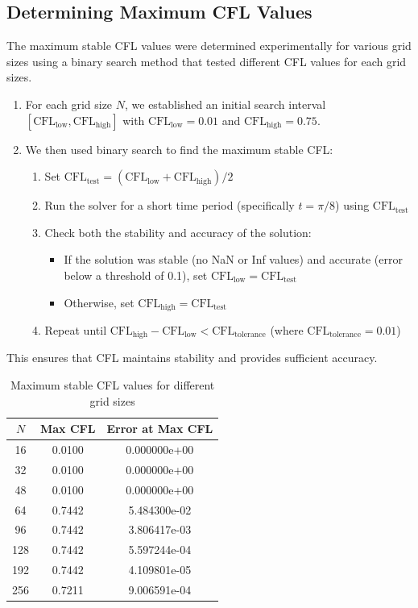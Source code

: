 \subsection{Determining Maximum CFL Values}
The maximum stable CFL values were determined experimentally for various grid sizes using a binary search method that tested different CFL values for each grid sizes.
\begin{enumerate}
	\item For each grid size $N$, we established an initial search interval $[\text{CFL}_{\text{low}}, \text{CFL}_{\text{high}}]$ with $\text{CFL}_{\text{low}} = 0.01$ and $\text{CFL}_{\text{high}} = 0.75$.
	\item We then used binary search to find the maximum stable CFL:
	      \begin{enumerate}
		      \item Set $\text{CFL}_{\text{test}} = (\text{CFL}_{\text{low}} + \text{CFL}_{\text{high}}) / 2$
		      \item Run the solver for a short time period (specifically $t = \pi/8$) using $\text{CFL}_{\text{test}}$
		      \item Check both the stability and accuracy of the solution:
		            \begin{itemize}
			            \item If the solution was stable (no NaN or Inf values) and accurate (error below a threshold of 0.1), set $\text{CFL}_{\text{low}} = \text{CFL}_{\text{test}}$
			            \item Otherwise, set $\text{CFL}_{\text{high}} = \text{CFL}_{\text{test}}$
		            \end{itemize}
		      \item Repeat until $\text{CFL}_{\text{high}} - \text{CFL}_{\text{low}} < \text{CFL}_{\text{tolerance}}$ (where $\text{CFL}_{\text{tolerance}} = 0.01$)
	      \end{enumerate}
\end{enumerate}
This ensures that CFL maintains stability and provides sufficient accuracy.
\begin{table}[H]
	\centering
	\begin{tabular}{|c|c|c|}
		\hline
		$N$ & Max CFL & Error at Max CFL \\
		\hline
		16  & 0.0100  & 0.000000e+00     \\
		32  & 0.0100  & 0.000000e+00     \\
		48  & 0.0100  & 0.000000e+00     \\
		64  & 0.7442  & 5.484300e-02     \\
		96  & 0.7442  & 3.806417e-03     \\
		128 & 0.7442  & 5.597244e-04     \\
		192 & 0.7442  & 4.109801e-05     \\
		256 & 0.7211  & 9.006591e-04     \\
		\hline
	\end{tabular}
	\caption{Maximum stable CFL values for different grid sizes}
	\label{tab:cfl}
\end{table}

